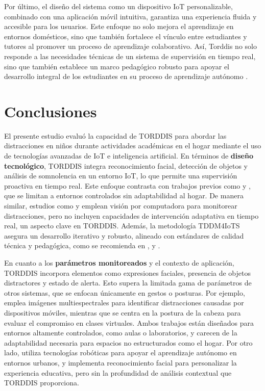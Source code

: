 \documentclass[a4paper,fleqn]{cas-sc}
\begin{document}
			 Por último, el diseño del sistema como un dispositivo IoT personalizable, combinado con una aplicación móvil intuitiva, garantiza una experiencia fluida y accesible para los usuarios. Este enfoque no solo mejora el aprendizaje en entornos domésticos, sino que también fortalece el vínculo entre estudiantes y tutores al promover un proceso de aprendizaje colaborativo. Así, Torddis no solo responde a las necesidades técnicas de un sistema de supervisión en tiempo real, sino que también establece un marco pedagógico robusto para apoyar el desarrollo integral de los estudiantes en su proceso de aprendizaje autónomo \citep{Li2024Systematic}.
			 
	\section{Conclusiones}
	\label{seccion:Seis}
		El presente estudio evaluó la capacidad de TORDDIS para abordar las distracciones en niños durante actividades académicas en el hogar mediante el uso de tecnologías avanzadas de IoT e inteligencia artificial. En términos de \textbf{diseño tecnológico}, TORDDIS integra reconocimiento facial, detección de objetos y análisis de somnolencia en un entorno IoT, lo que permite una supervisión proactiva en tiempo real. Este enfoque contrasta con trabajos previos como \cite{Campbell2015Using} y \cite{Ucar2022Recognizing}, que se limitan a entornos controlados sin adaptabilidad al hogar. De manera similar, estudios como \cite{Argel2023Intellitell} y \cite{Nguyen2019} emplean visión por computadora para monitorear distracciones, pero no incluyen capacidades de intervención adaptativa en tiempo real, un aspecto clave en TORDDIS. Además, la metodología TDDM4IoTS asegura un desarrollo iterativo y robusto, alineado con estándares de calidad técnica y pedagógica, como se recomienda en \cite{Erazo2016Easing}, \cite{Hachad2020} y \cite{Salter2014Exploring}.
		
		En cuanto a los \textbf{parámetros monitoreados} y el contexto de aplicación, TORDDIS incorpora elementos como expresiones faciales, presencia de objetos distractores y estado de alerta. Esto supera la limitada gama de parámetros de otros sistemas, que se enfocan únicamente en gestos o posturas. Por ejemplo, \cite{Campbell2015Using} emplea imágenes multiespectrales para identificar distracciones causadas por dispositivos móviles, mientras que \cite{Ucar2022Recognizing} se centra en la postura de la cabeza para evaluar el compromiso en clases virtuales. Ambos trabajos están diseñados para entornos altamente controlados, como aulas o laboratorios, y carecen de la adaptabilidad necesaria para espacios no estructurados como el hogar. Por otro lado, \cite{DaCosta2023} utiliza tecnologías robóticas para apoyar el aprendizaje autónomo en entornos urbanos, y \cite{Boumiza2017} implementa reconocimiento facial para personalizar la experiencia educativa, pero sin la profundidad de análisis contextual que TORDDIS proporciona.
		
\end{document}

